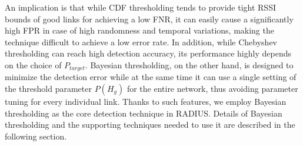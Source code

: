 An implication is that while CDF thresholding tends to provide tight RSSI bounds of good links for achieving a low FNR, it can easily cause a significantly high FPR in case of high randomness and temporal variations, making the technique difficult to achieve a low error rate. In addition, while Chebyshev thresholding can reach high detection accuracy, its performance highly depends on the choice of $P_{target}$. Bayesian thresholding, on the other hand, is designed to minimize the detection error while at the same time it can use a single setting of the threshold parameter $P(H_g)$ for the entire network, thus avoiding parameter tuning for every individual link. Thanks to such features, we employ Bayesian thresholding as the core detection technique in RADIUS. Details of Bayesian thresholding and the supporting techniques needed to use it are described in the following section.


